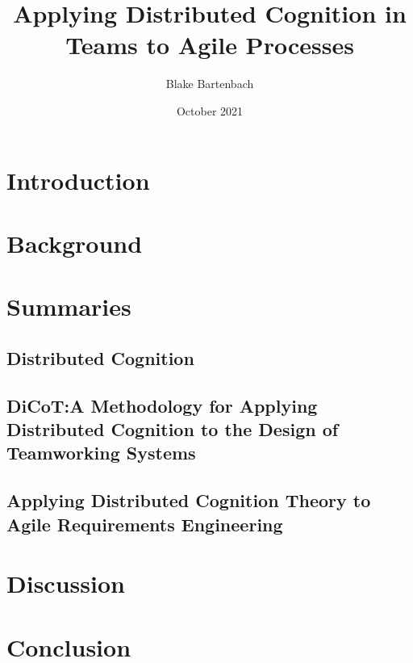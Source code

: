 \documentclass[acmsmall,screen]{acmart}
\begin{document}
\title{Applying Distributed Cognition in Teams to Agile Processes}

\author{Blake Bartenbach}
\date{October 2021}

\acmBooktitle{}

\begin{abstract}
  
\end{abstract}

\maketitle

\section{Introduction}


\section{Background}


\section{Summaries}
\subsection{Distributed Cognition}


\subsection{DiCoT:\@ A Methodology for Applying Distributed Cognition to the Design of Teamworking Systems}


\subsection{Applying Distributed Cognition Theory to Agile Requirements Engineering}


\section{Discussion}


\section{Conclusion}




\end{document}

